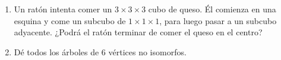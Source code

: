 \documentclass[12pt,spanish,makeidx]{amsbook}
\theoremstyle{definition}
\theoremstyle{remark}
\begin{document}
\begin{enumerate}
\medskip

\item Un ratón intenta comer un $3\times 3\times 3$ cubo de queso. Él comienza en una esquina y come un subcubo de $1\times 1\times 1$, para luego pasar a un subcubo adyacente. ¿Podrá el ratón terminar de comer el queso en el centro?


\item Dé todos los árboles de 6 vértices no isomorfos.



\end{enumerate}
\end{document}
